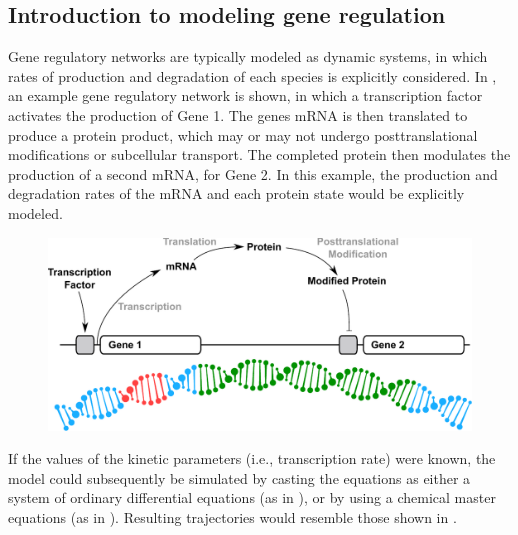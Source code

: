 \subsection{Introduction to modeling gene regulation}

Gene regulatory networks are typically modeled as dynamic systems, in which rates of production and degradation of each species is explicitly considered.
In , an example gene regulatory network is shown, in which a transcription factor activates the production of Gene 1. 
The genes mRNA is then translated to produce a protein product, which may or may not undergo posttranslational modifications or subcellular transport. 
The completed protein then modulates the production of a second mRNA, for Gene 2.
In this example, the production and degradation rates of the mRNA and each protein state would be explicitly modeled.

\begin{figure}[tbp]
  \centering
  \includegraphics[width=\textwidth, clip=True, trim=0 100 0 0]{chap1/figures/sysbio_intro.pdf}
  \label{fig:sysbiointro}
\end{figure}

If the values of the kinetic parameters (i.e., transcription rate) were known, the model could subsequently be simulated by casting the equations as either a system of ordinary differential equations (as in ), or by using a chemical master equations (as in ). Resulting trajectories would resemble those shown in .

